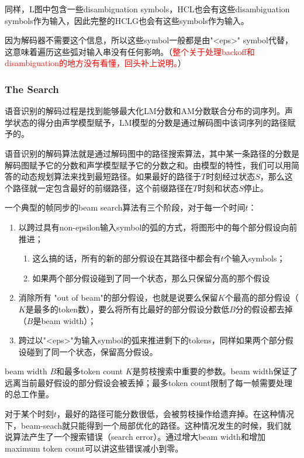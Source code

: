 {同样，L图中包含一些disambiguation symbols，HCL也会有这些disambiguation symbols作为输入，因此完整的HCLG也会有这些symbols作为输入。

因为解码器不需要这个信息，所以这些symbol一般都是由"<eps>" symbol代替，这意味着遍历这些弧对输入串没有任何影响。（\textcolor{red}{整个关于处理backoff和disambiguation的地方没有看懂，回头补上说明。}）

\subsubsection{The Search}
语音识别的解码过程是找到能够最大化LM分数和AM分数联合分布的词序列。声学状态的得分由声学模型赋予，LM模型的分数是通过解码图中该词序列的路径赋予的。

语音识别的解码算法就是通过解码图中的路径搜索算法，其中某一条路径的分数是解码图赋予它的分数和声学模型赋予它的分数之和。由模型的特性，我们可以用简答的动态规划算法来找到最短路径。如果最好的路径于$T$时刻经过状态$S$，那么这个路径就一定包含最好的前缀路径，这个前缀路径在$T$时刻和状态$S$停止。

一个典型的帧同步的beam search算法有三个阶段，对于每一个时间$t$：
\begin{enumerate}
  \item 以跨过具有non-epsilon输入symbol的弧的方式，将图形中的每个部分假设向前推进；
    \begin{enumerate}
      \item 这么搞的话，所有的新的部分假设在其路径中都会有$t$个输入symbols；
      \item 如果两个部分假设碰到了同一个状态，那么只保留分高的那个假设
    \end{enumerate}
  \item 消除所有 "out of beam"的部分假设，也就是说要么保留$K$个最高的部分假设（$K$是最多的token数），要么将所有比最好的部分假设分数低$B$分的假设都去掉（$B$是beam width）；
  \item 跨过以"<eps>"为输入symbol的弧来推进剩下的tokens，同样如果两个部分假设碰到了同一个状态，保留高分假设。
\end{enumerate}

beam width $B$和最多token count $K$是剪枝搜索中重要的参数。beam width保证了远离当前最好假设的部分假设会被丢掉；最多token count限制了每一帧需要处理的总工作量。

对于某个时刻$t$，最好的路径可能分数很低，会被剪枝操作给遗弃掉。在这种情况下，beam-seach就只能得到一个局部优化的路径。这种情况发生的时候，我们就说算法产生了一个搜索错误（search error）。通过增大beam width和增加maximum token count可以讲这些错误减小到零。

}
